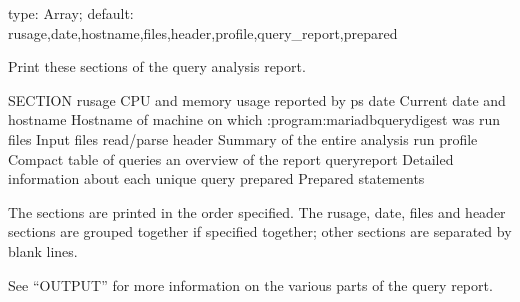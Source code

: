 \documentclass[letterpaper,10pt,english]{sphinxmanual}
\begin{document}
\begin{fulllineitems}
\label{\detokenize{mariadb-query-digest:cmdoption-mariadb-query-digest-report-format}}
type: Array; default: rusage,date,hostname,files,header,profile,query\_report,prepared

Print these sections of the query analysis report.

\begin{sphinxVerbatim}[commandchars=\\\{\}]
SECTION      
 
rusage       CPU  and memory usage reported by ps
date         Current  date and 
hostname     Hostname of machine on which :program:mariadb\PYGZhy{}query\PYGZhy{}digest was run
files        Input files read/parse
header       Summary of the entire analysis run
profile      Compact table of queries  an overview of the report
query\PYGZus{}report Detailed information about each unique query
prepared     Prepared statements
\end{sphinxVerbatim}

The sections are printed in the order specified.  The rusage, date, files and
header sections are grouped together if specified together; other sections are
separated by blank lines.

See “OUTPUT” for more information on the various parts of the query report.

\end{fulllineitems}

\end{document}
